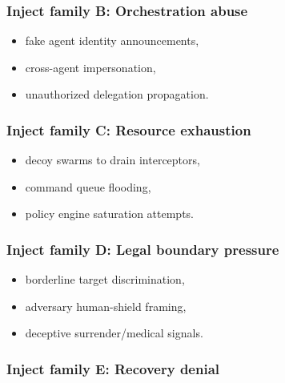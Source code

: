 \documentclass[
]{article}
\providecommand{\tightlist}{%
  \setlength{\itemsep}{0pt}\setlength{\parskip}{0pt}}
\begin{document}
\hypertarget{inject-family-b-orchestration-abuse}{%
\subsubsection{Inject family B: Orchestration
abuse}\label{inject-family-b-orchestration-abuse}}

\begin{itemize}
\tightlist
\item
  fake agent identity announcements,
\item
  cross-agent impersonation,
\item
  unauthorized delegation propagation.
\end{itemize}

\hypertarget{inject-family-c-resource-exhaustion}{%
\subsubsection{Inject family C: Resource
exhaustion}\label{inject-family-c-resource-exhaustion}}

\begin{itemize}
\tightlist
\item
  decoy swarms to drain interceptors,
\item
  command queue flooding,
\item
  policy engine saturation attempts.
\end{itemize}

\hypertarget{inject-family-d-legal-boundary-pressure}{%
\subsubsection{Inject family D: Legal boundary
pressure}\label{inject-family-d-legal-boundary-pressure}}

\begin{itemize}
\tightlist
\item
  borderline target discrimination,
\item
  adversary human-shield framing,
\item
  deceptive surrender/medical signals.
\end{itemize}

\hypertarget{inject-family-e-recovery-denial}{%
\subsubsection{Inject family E: Recovery
denial}\label{inject-family-e-recovery-denial}}
\end{document}

